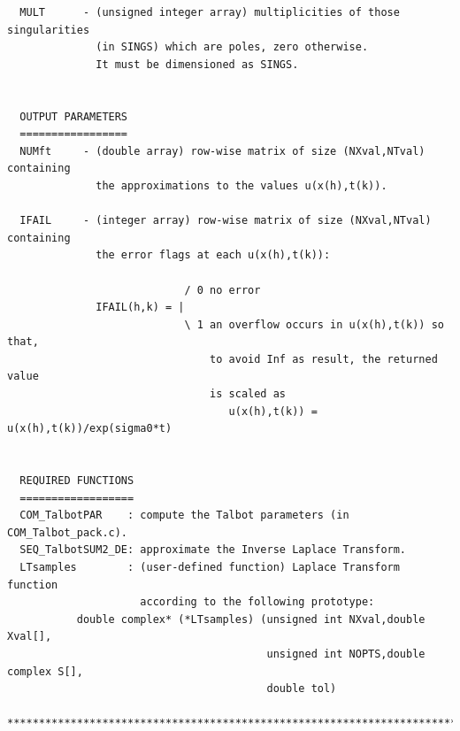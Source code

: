 \documentclass[a4paper,10pt]{report}%
\begin{document}
\begin{lstlisting}
  MULT      - (unsigned integer array) multiplicities of those singularities
              (in SINGS) which are poles, zero otherwise.
              It must be dimensioned as SINGS.


  OUTPUT PARAMETERS
  =================
  NUMft     - (double array) row-wise matrix of size (NXval,NTval) containing
              the approximations to the values u(x(h),t(k)).

  IFAIL     - (integer array) row-wise matrix of size (NXval,NTval) containing
              the error flags at each u(x(h),t(k)):

                            / 0 no error
              IFAIL(h,k) = |
                            \ 1 an overflow occurs in u(x(h),t(k)) so that,
                                to avoid Inf as result, the returned value
                                is scaled as
                                   u(x(h),t(k)) = u(x(h),t(k))/exp(sigma0*t)


  REQUIRED FUNCTIONS
  ==================
  COM_TalbotPAR    : compute the Talbot parameters (in COM_Talbot_pack.c).
  SEQ_TalbotSUM2_DE: approximate the Inverse Laplace Transform.
  LTsamples        : (user-defined function) Laplace Transform function
                     according to the following prototype:
           double complex* (*LTsamples) (unsigned int NXval,double Xval[],
                                         unsigned int NOPTS,double complex S[],
                                         double tol)

*****************************************************************************\
\end{lstlisting}
\end{document}
